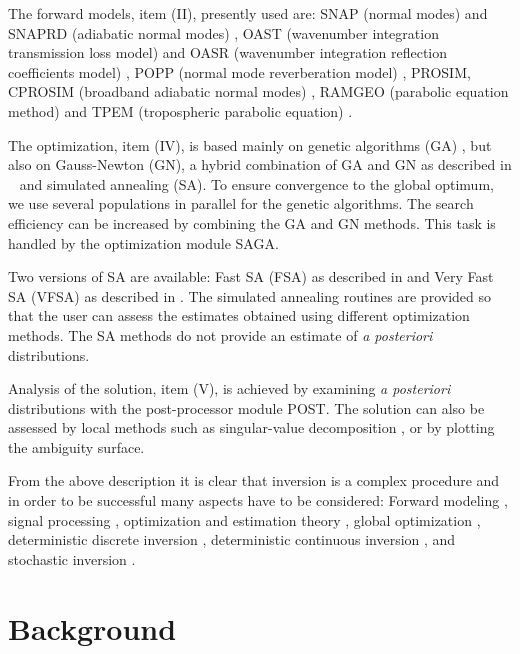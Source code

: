 \documentclass{saclantc}
\begin{document}
The forward models, item (II), presently used are:
{\sf SNAP} (normal modes) and
{\sf SNAPRD} (adiabatic normal modes) \cite{snap}, 
{\sf OAST} (wavenumber integration transmission loss model) and 
{\sf OASR} (wavenumber integration reflection coefficients model) 
\cite{hs:saf,hs:saf2},  
{\sf POPP} (normal mode reverberation model) \cite{ellis:asa95}, 
{\sf PROSIM, CPROSIM} (broadband adiabatic normal modes) 
\cite{prosim,levinson:asa95,westwood:asa96},
{\sf RAMGEO} (parabolic equation method) \cite{colins:ram,colins:asa93}
 and  {\sf TPEM} (tropospheric parabolic equation)
\cite{barrios:92,barrios:94}.

The optimization, item (IV), is based mainly on genetic algorithms
(GA) \cite{gerstoft:asa94}, but also on Gauss-Newton (GN), a hybrid
combination of GA and GN as described in \mbox{
\cite{gerstoft:asa94,gerstoft:asa95}} and simulated annealing (SA).
To ensure convergence to the global optimum, we
use several populations in parallel for the genetic algorithms. The
search efficiency can be increased by combining the GA and GN methods.
This task is handled by the optimization module {\sf SAGA}.

Two versions of SA are available: Fast SA (FSA) as
described in \cite{collins:asa92} and Very Fast SA (VFSA) as described in
\cite{ingber:89,ingber:93}.  The simulated annealing routines are provided
so that the user can assess  the estimates obtained using different
optimization methods. The SA methods do not provide an estimate
of {\it a posteriori} distributions. 

Analysis of the solution, item (V), is achieved by
 examining {\em a posteriori} distributions with the post-processor module {\sf POST}.  The solution can also be
 assessed by local methods such as  singular-value
 decomposition \cite{gerstoft:asa94,caiti:ieee94,pg:cop94}, or by plotting
 the ambiguity surface.

From the above description it is clear that inversion is a complex
procedure  and in order to be  successful  many aspects
have to be considered: Forward modeling \cite{jensen}, signal
processing \cite{tolstoy, kay}, optimization and estimation
theory \cite{bard}, global optimization \cite{sen95},
deterministic discrete inversion \cite{menke}, 
deterministic continuous inversion \cite{parker}, and 
stochastic inversion \cite{tarantola}.


\section{Background}
\end{document}
